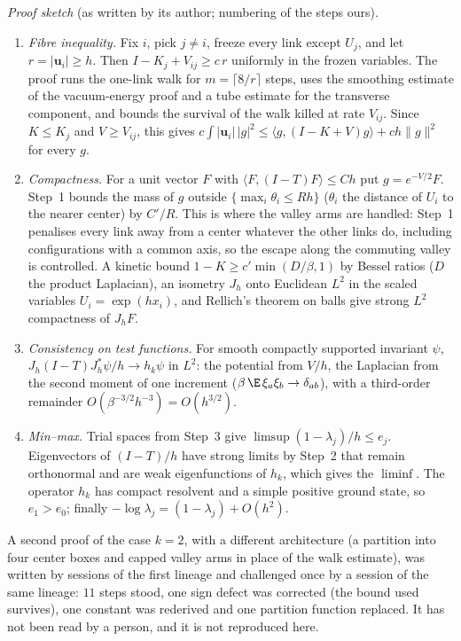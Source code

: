 \emph{Proof sketch} (as written by its author; numbering of the steps ours).
\begin{enumerate}
\item \emph{Fibre inequality.} Fix $i$, pick $j\ne i$, freeze every link except $U_j$, and let
$r=|\mathbf u_i|\ge h$. Then $I-K_j+V_{ij}\ge c\,r$ uniformly in the frozen variables. The proof runs the
one-link walk for $m=\lceil 8/r\rceil$ steps, uses the smoothing estimate of the vacuum-energy proof and a
tube estimate for the transverse component, and bounds the survival of the walk killed at rate $V_{ij}$.
Since $K\le K_j$ and $V\ge V_{ij}$, this gives
$c\int|\mathbf u_i|\,|g|^2\le\langle g,(I-K+V)g\rangle+ch\|g\|^2$ for every $g$.
\item \emph{Compactness.} For a unit vector $F$ with $\langle F,(I-T)F\rangle\le Ch$ put $g=e^{-V/2}F$.
Step~1 bounds the mass of $g$ outside $\{\max_i\theta_i\le Rh\}$ ($\theta_i$ the distance of $U_i$ to
the nearer center) by $C'/R$. This is where the valley arms are handled: Step~1 penalises every link
away from a center whatever the other links do, including configurations with a common axis, so the
escape along the commuting valley is controlled. A kinetic bound $1-K\ge c'\min(D/\beta,1)$ by Bessel
ratios ($D$ the product Laplacian), an isometry $J_h$ onto Euclidean $L^2$ in the scaled variables
$U_i=\exp(hx_i)$, and Rellich's theorem on balls give strong $L^2$ compactness of $J_hF$.
\item \emph{Consistency on test functions.} For smooth compactly supported invariant $\psi$,
$J_h(I-T)J_h^*\psi/h\to h_k\psi$ in $L^2$: the potential from $V/h$, the Laplacian from the second
moment of one increment ($\beta\,\E\,\xi_a\xi_b\to\delta_{ab}$), with a third-order remainder
$O(\beta^{-3/2}h^{-3})=O(h^{3/2})$.
\item \emph{Min--max.} Trial spaces from Step~3 give $\limsup(1-\lambda_j)/h\le e_j$. Eigenvectors of
$(I-T)/h$ have strong limits by Step~2 that remain orthonormal and are weak eigenfunctions of $h_k$, which
gives the $\liminf$. The operator $h_k$ has compact resolvent and a simple positive ground state, so
$e_1>e_0$; finally $-\log\lambda_j=(1-\lambda_j)+O(h^2)$.
\end{enumerate}

A second proof of the case $k=2$, with a different architecture (a partition into four center boxes and
capped valley arms in place of the walk estimate), was written by sessions of the first lineage and
challenged once by a session of the same lineage: $11$ steps stood, one sign defect was corrected (the
bound used survives), one constant was rederived and one partition function replaced. It has not been read
by a person, and it is not reproduced here.

